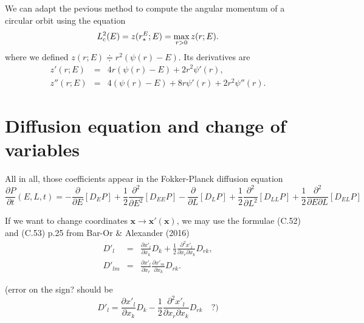 \documentclass[11pt]{article}
\newcommand{\dE}{D_{E}}
\newcommand{\dL}{D_{L}}
\newcommand{\dEE}{D_{EE}}
\newcommand{\dLL}{D_{LL}}
\newcommand{\dEL}{D_{EL}}
\newcommand{\bx}{\boldsymbol{x}}
\newcommand{\xp}{x'}
\newcommand{\bxp}{\boldsymbol{\xp}}
\begin{document}
We can adapt the pevious method to compute the angular momentum of a circular orbit using the equation
\begin{equation}
L_{{\rm c}}^{2}(E)=z(r_{*}^{E};E)=\max_{r>0}z(r;E).
\label{eq:angular_circular}
\end{equation}
where we defined $z(r;E)\doteqdot r^{2}(\psi(r)-E)$. Its derivatives are
\begin{equation}
\begin{array}{ccl}
  z'(r;E) & =& \displaystyle{4r(\psi(r)-E)+2r^{2}\psi'(r)} ,\\
  
  z''(r;E) & =&\displaystyle{4(\psi(r)-E)+8r\psi'(r)+2r^{2}\psi''(r)} .
\end{array}
\label{eq:z_derivatives}
\end{equation}

\section{Diffusion equation and change of variables}
\label{sec:diffEq_changeVar}

All in all, those coefficients appear in the Fokker-Planck diffusion
equation
\begin{equation}
\frac{\partial P}{\partial t}(E,L,t)=-\frac{\partial}{\partial E}\left[\dE P\right]+\frac{1}{2}\frac{\partial^{2}}{\partial E^{2}}\left[\dEE P\right]-\frac{\partial}{\partial L}\left[\dL P\right]+\frac{1}{2}\frac{\partial^{2}}{\partial L^{2}}\left[\dLL P\right]+\frac{1}{2}\frac{\partial^{2}}{\partial E\partial L}\left[\dEL P\right]
\label{eq:FP:equation}
\end{equation}

If we want to change coordinates $\bx\rightarrow\bxp(\bx)$,
we may use the formulae (C.52) and (C.53) p.25 from Bar-Or \& Alexander
(2016)
\begin{equation}
\begin{array}{ccl}
  D'_{l} & =& \displaystyle{\frac{\partial \xp_{l}}{\partial x_{k}}D_{k}+\frac{1}{2}\frac{\partial^{2}\xp_{l}}{\partial x_{r}\partial x_{k}}D_{rk}} ,\\
  
 D'_{lm} & =&\displaystyle{\frac{\partial \xp_{l}}{\partial x_{r}}\frac{\partial \xp_{m}}{\partial x_{k}}D_{rk}} .
\end{array}
\label{eq:change_var_DiffCoeffs}
\end{equation}


(error on the sign? should be
\[
D'_{l}=\frac{\partial \xp_{l}}{\partial x_{k}}D_{k}-\frac{1}{2}\frac{\partial^{2}\xp_{l}}{\partial x_{r}\partial x_{k}}D_{rk}\quad?)
\]
\end{document}
